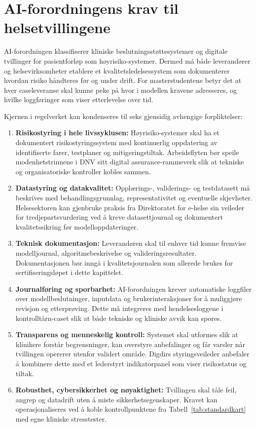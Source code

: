 \section{AI-forordningens krav til helsetvillingene}
AI-forordningen klassifiserer kliniske beslutningsstøttesystemer og digitale tvillinger for pasientforløp som høyrisiko-systemer.\citep{eu2024aiact} Dermed må både leverandører og helsevirksomheter etablere et kvalitetsledelsessystem som dokumenterer hvordan risiko håndteres før og under drift. For masterstudentene betyr det at hver caseleveranse skal kunne peke på hvor i modellen kravene adresseres, og hvilke loggføringer som viser etterlevelse over tid.

Kjernen i regelverket kan kondenseres til seks gjensidig avhengige forpliktelser:
\begin{enumerate}
    \item \textbf{Risikostyring i hele livssyklusen:} Høyrisiko-systemer skal ha et dokumentert risikostyringssystem med kontinuerlig oppdatering av identifiserte farer, testplaner og mitigeringstiltak.\citep{eu2024aiact} Arbeidsflyten bør speile modenhetstrinnene i DNV sitt digital assurance-rammeverk slik at tekniske og organisatoriske kontroller kobles sammen.\citep{dnv2023digitalassurance}
    \item \textbf{Datastyring og datakvalitet:} Opplærings-, validerings- og testdatasett må beskrives med behandlingsgrunnlag, representativitet og eventuelle skjevheter.\citep{eu2024aiact} Helsesektoren kan gjenbruke praksis fra Direktoratet for e-helse sin veileder for tredjepartsvurdering ved å kreve datasettjournal og dokumentert kvalitetssikring før modelloppdateringer.\citep{ehelse2024tilsyn}
    \item \textbf{Teknisk dokumentasjon:} Leverandøren skal til enhver tid kunne fremvise modelljournal, algoritmebeskrivelse og valideringsresultater.\citep{eu2024aiact} Dokumentasjonen bør inngå i kvalitetsjournalen som allerede brukes for sertifiseringsløpet i dette kapittelet.
    \item \textbf{Journalføring og sporbarhet:} AI-forordningen krever automatiske loggfiler over modellbeslutninger, inputdata og brukerinteraksjoner for å muliggjøre revisjon og etterprøving.\citep{eu2024aiact} Dette må integreres med hendelsesloggene i kontrolltårn-caset slik at både tekniske og kliniske avvik kan spores.
    \item \textbf{Transparens og menneskelig kontroll:} Systemet skal utformes slik at klinikere forstår begrensninger, kan overstyre anbefalinger og får varsler når tvillingen opererer utenfor validert område.\citep{eu2024aiact} Digdirs styringsveileder anbefaler å kombinere dette med et lederstyrt indikatorpanel som viser risikostatus og tiltak.\citep{digdir2023styringai}
    \item \textbf{Robusthet, cybersikkerhet og nøyaktighet:} Tvillingen skal tåle feil, angrep og datadrift uten å miste sikkerhetsegenskaper.\citep{eu2024aiact} Kravet kan operasjonaliseres ved å koble kontrollpunktene fra Tabell~\ref{tab:standardkart} med egne kliniske stresstester.
\end{enumerate}

